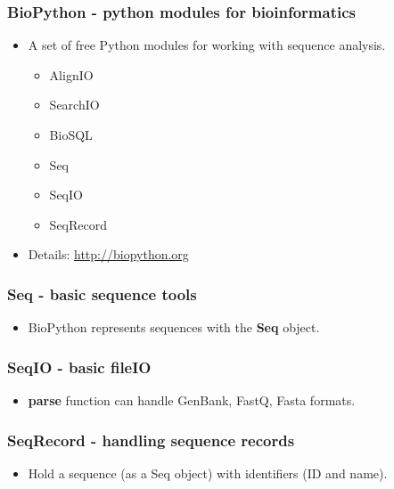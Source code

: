 \documentclass[11pt]{beamer}
\begin{document}
\begin{frame}[plain]
    \frametitle{BioPython - python modules for bioinformatics}
    \begin{itemize}
        \item[] A set of free Python modules for working with sequence analysis.
        \newline
        \pause 
        \begin{itemize}
            \item[] AlignIO 
            \item[] SearchIO
            \item[] BioSQL
            \item[] Seq
            \item[] SeqIO
            \item[] SeqRecord
            \newline
            \pause
        \end{itemize}
        \item[] Details: \url{http://biopython.org}
    \end{itemize}
\end{frame}
%
\begin{frame}[plain]
    \frametitle{Seq - basic sequence tools}
    \begin{itemize}
        \item[]  BioPython represents sequences with the \textbf{Seq} object. 
        \newline
        \pause
        
    \end{itemize}
\end{frame}
%
\begin{frame}[plain]
    \frametitle{SeqIO - basic fileIO}
    \begin{itemize}
        \item[] \textbf{parse} function can handle GenBank, FastQ, Fasta formats.  
        \newline
        \pause
        
        \pause
        
    \end{itemize}
\end{frame}
%
\begin{frame}[plain]
    \frametitle{SeqRecord - handling sequence records}
    \begin{itemize}
        \item[] Hold a sequence (as a Seq object) with identifiers (ID and name).
        \pause
        
    \end{itemize}
\end{frame}
\end{document}
